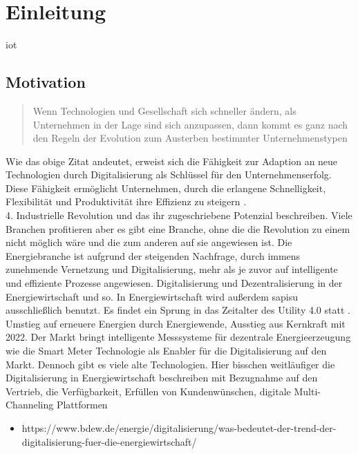\section{Einleitung}

\ac{iot}

\subsection{Motivation}

\begin{quotation} \noindent
  \glqq Wenn Technologien und Gesellschaft sich schneller ändern, als Unternehmen in der Lage sind sich anzupassen, dann kommt es ganz nach den Regeln der Evolution zum Austerben bestimmter Unternehmenstypen\grqq{} \citep[S. 3, zitiert nach Land, K.-H. 2015]{Roth2016}
\end{quotation}

Wie das obige Zitat andeutet, erweist sich die Fähigkeit zur Adaption an neue Technologien durch Digitalisierung als Schlüssel für den Unternehmenserfolg. Diese Fähigkeit ermöglicht Unternehmen, durch die erlangene Schnelligkeit, Flexibilität und Produktivität ihre Effizienz zu steigern \citep{Roth2016}.
\\4. Industrielle Revolution und das ihr zugeschriebene Potenzial beschreiben. Viele Branchen profitieren aber es gibt eine Branche,
ohne die die Revolution zu einem nicht möglich wäre und die zum anderen auf sie angewiesen ist.
Die Energiebranche ist aufgrund der steigenden Nachfrage, durch immens zunehmende Vernetzung und Digitalisierung, mehr als je zuvor auf intelligente und effiziente Prozesse angewiesen.
Digitalisierung und Dezentralisierung in der Energiewirtschaft und so. In Energiewirtschaft wird außerdem \ac{sapisu} ausschließlich benutzt.
Es findet ein Sprung in das Zeitalter des \glqq Utility 4.0\grqq{} statt \citep{Doleski2017}.
Umstieg auf erneuere Energien durch Energiewende, Ausstieg aus Kernkraft mit 2022. Der Markt bringt intelligente Messsysteme für dezentrale Energieerzeugung wie die Smart Meter Technologie als Enabler für
die Digitalisierung auf den Markt. Dennoch gibt es viele alte Technologien.
Hier bisschen weitläufiger die Digitalisierung in Energiewirtschaft beschreiben mit Bezugnahme auf den Vertrieb,
die Verfügbarkeit, Erfüllen von Kundenwünschen, digitale Multi-Channeling Plattformen

\begin{itemize}
  \item https://www.bdew.de/energie/digitalisierung/was-bedeutet-der-trend-der-digitalisierung-fuer-die-energiewirtschaft/
\end{itemize}

